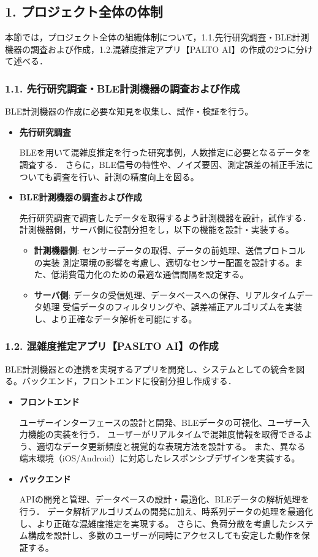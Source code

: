 \subsection*{1. プロジェクト全体の体制}
本節では，プロジェクト全体の組織体制について，1.1.先行研究調査・BLE計測機器の調査および作成，1.2.混雑度推定アプリ【PALTO AI】の作成の2つに分けて述べる．

\subsubsection*{1.1. 先行研究調査・BLE計測機器の調査および作成}
BLE計測機器の作成に必要な知見を収集し、試作・検証を行う。
\begin{itemize}
    \item {\bfseries 先行研究調査}
    
    BLEを用いて混雑度推定を行った研究事例，人数推定に必要となるデータを調査する．
	さらに，BLE信号の特性や、ノイズ要因、測定誤差の補正手法についても調査を行い、計測の精度向上を図る。
    
    \item {\bfseries BLE計測機器の調査および作成}
    
    先行研究調査で調査したデータを取得するよう計測機器を設計，試作する．
    計測機器側，サーバ側に役割分担をし，以下の機能を設計・実装する。
    \begin{itemize}
        \item {\bfseries 計測機器側}: センサーデータの取得、データの前処理、送信プロトコルの実装
		測定環境の影響を考慮し、適切なセンサー配置を設計する。また、低消費電力化のための最適な通信間隔を設定する。
        \item {\bfseries サーバ側}: データの受信処理、データベースへの保存、リアルタイムデータ処理
		受信データのフィルタリングや、誤差補正アルゴリズムを実装し、より正確なデータ解析を可能にする。
    \end{itemize}
\end{itemize}

\subsubsection*{1.2. 混雑度推定アプリ【PASLTO AI】の作成}
BLE計測機器との連携を実現するアプリを開発し、システムとしての統合を図る。バックエンド，フロントエンドに役割分担し作成する．
\begin{itemize}
    \item {\bfseries フロントエンド}
    
    ユーザーインターフェースの設計と開発、BLEデータの可視化、ユーザー入力機能の実装を行う．
	ユーザーがリアルタイムで混雑度情報を取得できるよう、適切なデータ更新頻度と視覚的な表現方法を設計する。
	また、異なる端末環境（iOS/Android）に対応したレスポンシブデザインを実装する。
    
    \item {\bfseries バックエンド}
    
    APIの開発と管理、データベースの設計・最適化、BLEデータの解析処理を行う．
	データ解析アルゴリズムの開発に加え、時系列データの処理を最適化し、より正確な混雑度推定を実現する。
	さらに、負荷分散を考慮したシステム構成を設計し、多数のユーザーが同時にアクセスしても安定した動作を保証する。
\end{itemize}

